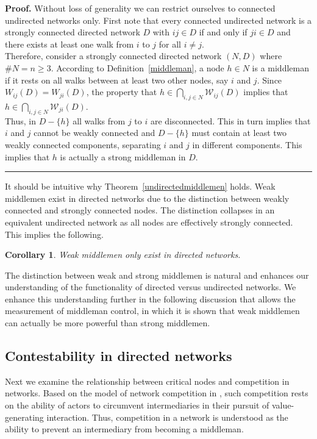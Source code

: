 \documentclass[11pt,fleqn]{article}
\newtheorem{corollary}[theorem]{Corollary}
\newenvironment{proof}[1][Proof]{\noindent \textbf{#1.} }{\hfill
\rule{0.5em}{0.5em}}
\begin{document}
\begin{proof}
Without loss of generality we can restrict ourselves to connected undirected networks only. First note that every connected undirected network is a strongly connected directed network $D$ with $ij \in D$ if and only if $ji \in D$ and there exists at least one walk from $i$ to $j$ for all $i \neq j$.
\\
Therefore, consider a strongly connected directed network $(N,D)$ where $\# N =n \geqslant 3$. According to Definition~\ref{middleman}, a node $h \in N$ is a middleman if it rests on all walks between at least two other nodes, say $i$ and $j$. Since $W_{ij}(D) = W_{ji}(D)$, the property that $h \in \bigcap_{i,j \in N} \mathcal{W}_{ij}(D)$ implies that $h \in \bigcap_{i,j \in N} \mathcal{W}_{ji}(D)$.
\\
Thus, in $D - \{h\}$ all walks from $j$ to $i$ are disconnected. This in turn implies that $i$ and $j$ cannot be weakly connected and $D - \{h\}$ must contain at least two weakly connected components, separating $i$ and $j$ in different components. This implies that $h$ is actually a strong middleman in $D$.
\end{proof}

\medskip \noindent It should be intuitive why Theorem~\ref{undirectedmiddlemen} holds. Weak middlemen exist in directed networks due to the distinction between weakly connected and strongly connected nodes. The distinction collapses in an equivalent undirected network as all nodes are effectively strongly connected. This implies the following.

\begin{corollary} \label{corundirectedmiddleman}
Weak middlemen only exist in directed networks.
\end{corollary}

The distinction between weak and strong middlemen is natural and enhances our understanding of the functionality of directed versus undirected networks. We enhance this understanding further in the following discussion that allows the measurement of middleman control, in which it is shown that weak middlemen can actually be more powerful than strong middlemen.

\subsection{Contestability in directed networks}

Next we examine the relationship between critical nodes and competition in networks. Based on the model of network competition in \citet{GillesDiamantaris2013}, such competition rests on the ability of actors to circumvent intermediaries in their pursuit of value-generating interaction. Thus, competition in a network is understood as the ability to prevent an intermediary from becoming a middleman.
\end{document}
